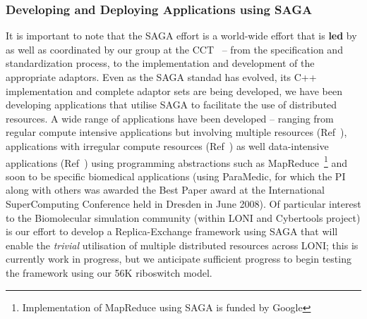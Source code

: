 \documentclass[a4paper,10pt]{article}
\begin{document}
\subsubsection*{Developing and Deploying Applications using SAGA}

It is important to note that the SAGA effort is a world-wide effort that is {\bf led} by as well as coordinated 
by our group at the CCT~\cite{saga_url} -- from the specification and standardization process, to the 
implementation and development of the appropriate adaptors. 
Even as the SAGA standad has evolved,  its C++  implementation  and complete adaptor
sets are being developed, we have  been
developing applications that utilise SAGA to facilitate the use of distributed resources. 
A wide range of applications have been developed -- ranging from regular compute
intensive applications but involving multiple resources (Ref~\cite{saga_escience07}), 
applications with irregular compute resources (Ref~\cite{teragrid08}) as well data-intensive
applications (Ref~\cite{sagamapreduce}) using programming abstractions such as MapReduce~\footnote{Implementation of MapReduce using SAGA is funded by Google}
and soon to be specific biomedical applications (using ParaMedic, for which the PI along
with others was awarded the Best Paper award at the International SuperComputing 
Conference held in Dresden in June 2008). Of particular interest to the Biomolecular simulation 
community (within LONI and Cybertools project) is 
our effort to develop a Replica-Exchange framework using SAGA that will enable the {\it trivial} utilisation of
multiple distributed resources across LONI; this is currently work in progress, but we anticipate
sufficient progress to begin testing the framework using our 56K riboswitch model.
\end{document}
